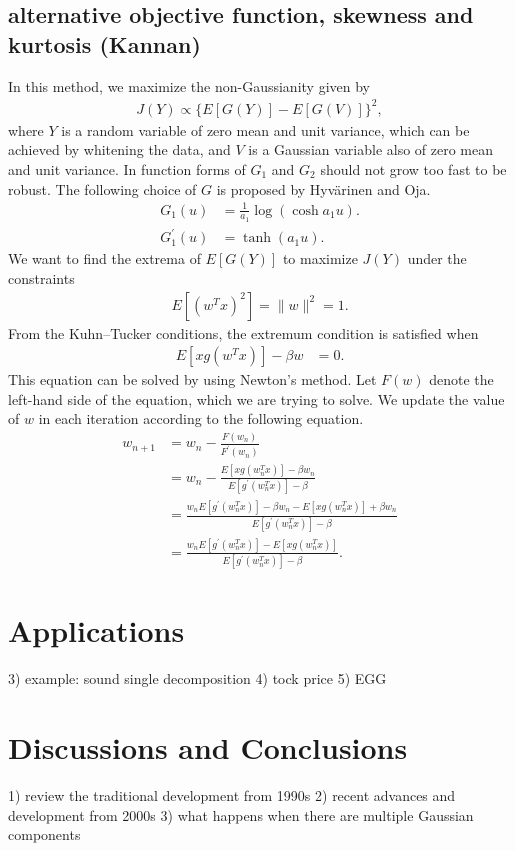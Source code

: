 \documentclass[aps,prl,preprint,superscriptaddress]{revtex4-2}
\begin{document}
\subsection{alternative objective function, skewness and kurtosis (Kannan)}
In this method, we maximize the non-Gaussianity given by
\begin{align}
J(Y) \propto \{E[G(Y)] - E[G(V)]\}^2,
\end{align}
where $Y$ is a random variable of zero mean and unit variance, which can be achieved by whitening the data, and $V$ is a Gaussian variable also of zero mean and unit variance. In function forms of $G_1$ and $G_2$ should not grow too fast to be robust. The following choice of $G$ is proposed by Hyvärinen and Oja.
\begin{align}
G_1(u) &= \frac{1}{a_1} \log (\cosh a_1 u). \\
G_1^{\prime}(u) &= \tanh(a_1 u).
\end{align}
We want to find the extrema of $E[G(Y)]$ to maximize $J(Y)$ under the constraints
\begin{align}
E[(w^T x)^2] = \| w\|^2 = 1.
\end{align}
From the Kuhn--Tucker conditions, the extremum condition is satisfied when
\begin{align}
E[x g(w^Tx)] - \beta w &= 0.
\end{align}
This equation can be solved by using Newton's method.
Let $F(w)$ denote the left-hand side of the equation, which we are trying to solve.
We update the value of $w$ in each iteration according to the following equation.
\begin{align}
w_{n+1} &= w_n - \frac{F(w_n)}{F^{\prime}(w_n)} \\
&= w_n - \frac{E[x g (w_n^T x)] - \beta w_n}{E[g^{\prime}(w_n^T x)] - \beta} \\
&= \frac{w_n E[g^{\prime}(w_n^T x)] - \beta w_n - E[x g (w_n^T x)] + \beta w_n}{E[g^{\prime}(w_n^T x)] - \beta} \\
&= \frac{w_n E[g^{\prime}(w_n^T x)] - E[x g (w_n^T x)]}{E[g^{\prime}(w_n^T x)] - \beta}.
\end{align}

\section{Applications}
3) example: sound single decomposition
4) tock price
5) EGG




\section{Discussions and Conclusions}
1) review the traditional development from 1990s
2) recent advances and development from 2000s  
3) what happens when there are multiple Gaussian components
\end{document}
